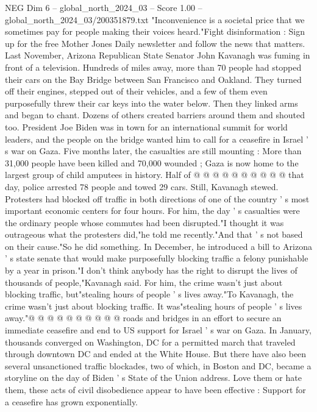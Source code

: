 \begin{textsample}{NEG Dim 6 – global\_north\_2024\_03 – Score 1.00 – global\_north\_2024\_03/200351879.txt}  \label{ex:f6_neg_398}
"Inconvenience is a societal price that we sometimes pay for people making their voices heard."Fight disinformation : Sign up for the free Mother Jones Daily newsletter and follow the news that matters.
Last November, Arizona Republican State Senator John Kavanagh was fuming in front of a television.
Hundreds of miles away, more than 70 people had stopped their cars on the Bay Bridge between San Francisco and Oakland.
They turned off their engines, stepped out of their vehicles, and a few of them even purposefully threw their car keys into the water below.
Then they linked arms and began to chant.
Dozens of others created barriers around them and shouted too.
President Joe Biden was in town for an international summit for world leaders, and the people on the bridge wanted him to call for a ceasefire in Israel ' s war on Gaza.
Five months later, the casualties are still mounting : More than 31,000 people have been killed and 70,000 wounded ; Gaza is now home to the largest group of child amputees in history.
Half of @ @ @ @ @ @ @ @ @ @ that day, police arrested 78 people and towed 29 cars.
Still, Kavanagh stewed.
Protesters had blocked off traffic in both directions of one of the country ' s most important economic centers for four hours.
For him, the day ' s casualties were the ordinary people whose commutes had been disrupted."I thought it was outrageous what the protesters did,"he told me recently."And that ' s not based on their cause."So he did something.
In December, he introduced a bill to Arizona ' s state senate that would make purposefully blocking traffic a felony punishable by a year in prison."I don't think anybody has the right to disrupt the lives of thousands of people,"Kavanagh said.
For him, the crime wasn't just about blocking traffic, but"stealing hours of people ' s lives away."To Kavanagh, the crime wasn't just about blocking traffic.
It was"stealing hours of people ' s lives away."@ @ @ @ @ @ @ @ @ @ roads and bridges in an effort to secure an immediate ceasefire and end to US support for Israel ' s war on Gaza.
In January, thousands converged on Washington, DC for a permitted march that traveled through downtown DC and ended at the White House.
But there have also been several unsanctioned traffic blockades, two of which, in Boston and DC, became a storyline on the day of Biden ' s State of the Union address.
Love them or hate them, these acts of civil disobedience appear to have been effective : Support for a ceasefire has grown exponentially.

\end{textsample}
